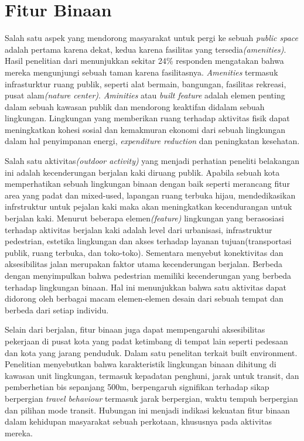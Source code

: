 \documentclass[../thesis.tex]{subfiles}
\begin{document}
\section{Fitur Binaan }

Salah satu aspek yang mendorong masyarakat untuk pergi ke sebuah \textit{public space} adalah pertama karena dekat, kedua karena fasilitas yang tersedia\textit{(amenities)}. Hasil penelitian dari \cite{campbell2016social} menunjukkan sekitar 24\% responden mengatakan bahwa mereka mengunjungi sebuah taman karena fasilitasnya. \textit{Amenities} termasuk infrasturktur ruang publik, seperti alat bermain, bangungan, fasilitas rekreasi, pusat alam\textit{(nature center)}. \textit{Aminities} atau \textit{built feature} adalah elemen penting dalam sebuah kawasan publik dan mendorong keaktifan didalam sebuah lingkungan.
Lingkungan yang memberikan ruang terhadap aktivitas fisik dapat meningkatkan kohesi sosial dan kemakmuran ekonomi dari sebuah lingkungan dalam hal penyimpanan energi, \textit{expenditure reduction} dan peningkatan kesehatan\citep{dovey2020walkability,klann2019translating}.

Salah satu aktivitas\textit{(outdoor activity)} yang menjadi perhatian peneliti belakangan ini adalah kecenderungan berjalan kaki diruang publik.
Apabila sebuah kota memperhatikan sebuah lingkungan binaan dengan baik seperti merancang fitur area yang padat dan mixed-used, lapangan ruang terbuka hijau, mendedikasikan infrstruktur untuk pejalan kaki maka akan meningkatkan kecendurangan untuk berjalan kaki\citep{cheng2020examining,cao2010neighborhood,cerin2014ageing}. Menurut \citep{cerin2014ageing} beberapa elemen\textit{(feature)} lingkungan yang berasosiasi terhadap aktivitas berjalan kaki adalah level dari urbanisasi, infrastruktur pedestrian, estetika lingkungan dan akses terhadap layanan tujuan(transportasi publik, ruang terbuka, dan toko-toko). Sementara \cite{ramakreshnan2020motivations} menyebut konektivitas dan aksesibilitas jalan merupakan faktor utama kecenderungan berjalan. Berbeda dengan \cite{liu2020impact} menyimpulkan bahwa pedestrian memiliki kecenderungan yang berbeda terhadap lingkungan binaan.
Hal ini menunjukkan bahwa satu aktivitas dapat didorong oleh berbagai macam elemen-elemen desain dari sebuah tempat dan berbeda dari setiap individu.

Selain dari berjalan, fitur binaan juga dapat mempengaruhi aksesibilitas pekerjaan di pusat kota yang padat ketimbang di tempat lain seperti pedesaan dan kota yang jarang penduduk\citep{zhu2020built}.
Dalam satu penelitan terkait built environment. Penelitian \citep{yu2019exploring}  menyebutkan bahwa karakteristik lingkungan binaan dihitung di kawasan unit lingkungan, termasuk kepadatan penghuni, jarak untuk transit, dan pemberhetian bis sepanjang 500m, berpengaruh signifikan terhadap sikap berpergian \textit{travel behaviour} termasuk jarak berpergian, waktu tempuh berpergian dan pilihan mode transit. Hubungan ini menjadi indikasi kekuatan fitur binaan dalam kehidupan masyarakat sebuah perkotaan, khususnya pada aktivitas mereka.
\end{document}
